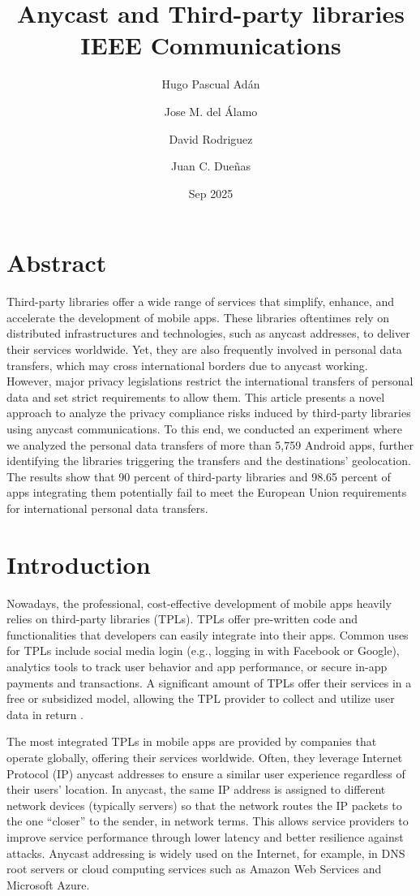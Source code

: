 \documentclass{article}
\title{Anycast and Third-party libraries IEEE Communications}
\author{
Hugo Pascual Adán
\and
Jose M. del Álamo
\and
David Rodriguez
\and
Juan C. Dueñas
}
\date{Sep 2025}
\begin{document}
\maketitle

\section{Abstract}

Third-party libraries offer a wide range of services that simplify, enhance, and accelerate the development of mobile apps. These libraries oftentimes rely on distributed infrastructures and technologies, such as anycast addresses, to deliver their services worldwide. Yet, they are also frequently involved in personal data transfers, which may cross international borders due to anycast working. However, major privacy legislations restrict the international transfers of personal data and set strict requirements to allow them. This article presents a novel approach to analyze the privacy compliance risks induced by third-party libraries using anycast communications. To this end, we conducted an experiment where we analyzed the personal data transfers of more than 5,759 Android apps, further identifying the libraries triggering the transfers and the destinations' geolocation. The results show that 90 percent of third-party libraries and 98.65 percent of apps integrating them potentially fail to meet the European Union requirements for international personal data transfers.

\section{Introduction}

Nowadays, the professional, cost-effective development of mobile apps heavily relies on third-party libraries (TPLs). TPLs offer pre-written code and functionalities that developers can easily integrate into their apps. Common uses for TPLs include social media login (e.g., logging in with Facebook or Google), analytics tools to track user behavior and app performance, or secure in-app payments and transactions. A significant amount of TPLs offer their services in a free or subsidized model, allowing the TPL provider to collect and utilize user data in return \cite{Zhan2022ResearchReview}.

The most integrated TPLs in mobile apps are provided by companies that operate globally, offering their services worldwide. Often, they leverage Internet Protocol (IP) anycast addresses \cite{Abley2006OperationServices} to ensure a similar user experience regardless of their users' location. In anycast, the same IP address is assigned to different network devices (typically servers) so that the network routes the IP packets to the one “closer” to the sender, in network terms. This allows service providers to improve service performance through lower latency and better resilience against attacks. Anycast addressing is widely used on the Internet, for example, in DNS root servers or cloud computing services such as Amazon Web Services and Microsoft Azure.
\end{document}
